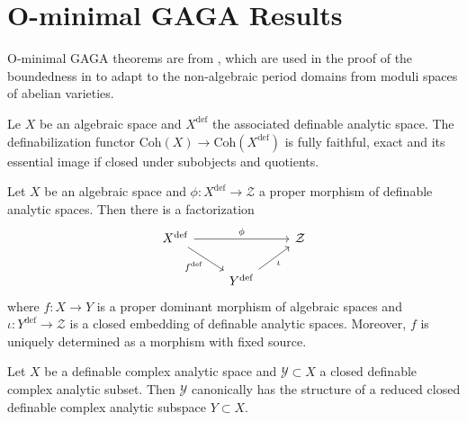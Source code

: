 \documentclass[
	fontsize=10pt, %
]{kaohandt}
\newcommand{\definable}{\mathrm{def}}
\begin{document}
\section{O-minimal GAGA Results}
O-minimal GAGA theorems are from \cite{zbMATH07662555},
which are used in the proof of the boundedness in \cite{arXiv:2507.00973,arXiv:2508.19215}
to adapt to the non-algebraic period domains from moduli spaces of abelian varieties.

\begin{theorem}
    Le $X$ be an algebraic space and $X^{\definable}$ the associated definable analytic space.
    The definabilization functor $\mathrm{Coh}(X) \to \mathrm{Coh}(X^{\definable})$ is fully faithful, exact and 
    its essential image if closed under subobjects and quotients.
\end{theorem}

\begin{theorem}
    Let $X$ be an algebraic space and 
    $\phi: X^{\definable} \to \mathcal{Z}$ a proper morphism of definable analytic spaces.
    Then there is a factorization
    \[\begin{tikzcd}
    X^{\definable}\ar[rr,"\phi"]\ar[dr,"f^{\definable}"'] & & \mathcal{Z} \\
    & Y^{\definable}\ar[ur,"\iota"'] &
    \end{tikzcd}\]
    where $f: X\to Y$ is a proper dominant morphism of algebraic spaces and 
    $\iota: Y^{\definable} \to \mathcal{Z}$ is a closed embedding of definable analytic spaces.
    Moreover, $f$ is uniquely determined as a morphism with fixed source.
\end{theorem}

\begin{proposition}
    Let $X$ be a definable complex analytic space and 
    $\mathcal{Y} \subset X$ a closed definable complex analytic subset.
    Then $\mathcal{Y}$ canonically has the structure of a reduced closed definable complex analytic subspace $Y \subset X$.
\end{proposition}
\end{document}
